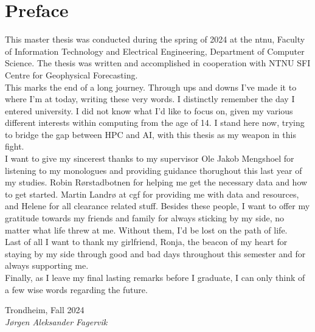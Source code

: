 \chapter*{Preface}

This master thesis was conducted during the spring of 2024 at the \acrfull{ntnu}, Faculty of Information Technology and Electrical Engineering, Department of Computer Science. The thesis was written and accomplished in cooperation with NTNU SFI Centre for Geophysical Forecasting. \\

This marks the end of a long journey. Through ups and downs I've made it to where I'm at today, writing these very words. I distinctly remember the day I entered university. I did not know what I'd like to focus on, given my various different interests within computing from the age of 14. I stand here now, trying to bridge the gap between HPC and AI, with this thesis as my weapon in this fight. \\

I want to give my sincerest thanks to my supervisor Ole Jakob Mengshoel for listening to my monologues and providing guidance thorughout this last year of my studies. Robin Rørstadbotnen for helping me get the necessary data and how to get started. Martin Landrø at \acrlong{cgf} for providing me with data and resources, and Helene for all clearance related stuff. Besides these people, I want to offer my gratitude towards my friends and family for always sticking by my side, no matter what life threw at me. Without them, I'd be lost on the path of life. \\

Last of all I want to thank my girlfriend, Ronja, the beacon of my heart for staying by my side through good and bad days throughout this semester and for always supporting me.\\

Finally, as I leave my final lasting remarks before I graduate, I can only think of a few wise words regarding the future.

\begin{flushright}
Trondheim, Fall 2024  \\
\textit{Jørgen Aleksander Fagervik}
\end{flushright}